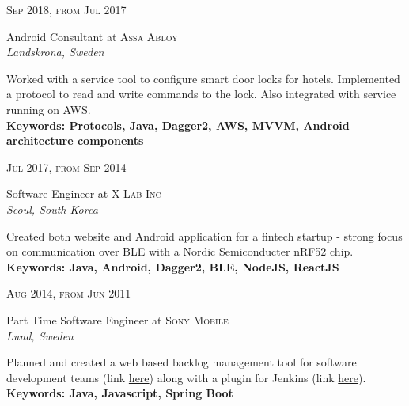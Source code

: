\documentclass[10pt]{article} %
\begin{document}
{\begin{minipage}[t]{0.5\textwidth}
{\raggedleft\textsc{Sep 2018, from Jul 2017}\par}

{\raggedright\large Android Consultant at \textsc{Assa Abloy}\\
\textit{Landskrona, Sweden}\\[5pt]}
\normalsize{Worked with a service tool to configure smart door locks for hotels. Implemented a protocol to read and write commands to the lock. Also integrated with service running on AWS.}\\ 
\textbf{Keywords: Protocols, Java, Dagger2, AWS, MVVM, Android architecture components }\\


{\raggedleft\textsc{Jul 2017, from Sep 2014}\par}

{\raggedright\large Software Engineer at \textsc{X Lab Inc}\\
\textit{Seoul, South Korea}\\[5pt]}

\normalsize{Created both website and Android application for a fintech startup - strong focus on communication over BLE with a Nordic Semiconducter nRF52 chip.}\\ 
\textbf{Keywords: Java, Android, Dagger2, BLE, NodeJS, ReactJS }\\


{\raggedleft\textsc{Aug 2014, from Jun 2011}\par}

{\raggedright\large Part Time Software Engineer at \textsc{Sony Mobile}\\
\textit{Lund, Sweden}\\[5pt]}

\normalsize{Planned and created a web based backlog management tool for software development teams (link \href{https://github.com/sonyxperiadev/BacklogTool}{here}) along with a plugin for Jenkins (link \href{https://github.com/jenkinsci/multi-slave-config-plugin}{here}).} \\ 
\textbf{Keywords: Java, Javascript, Spring Boot }\\



\end{minipage}}
\end{document}

